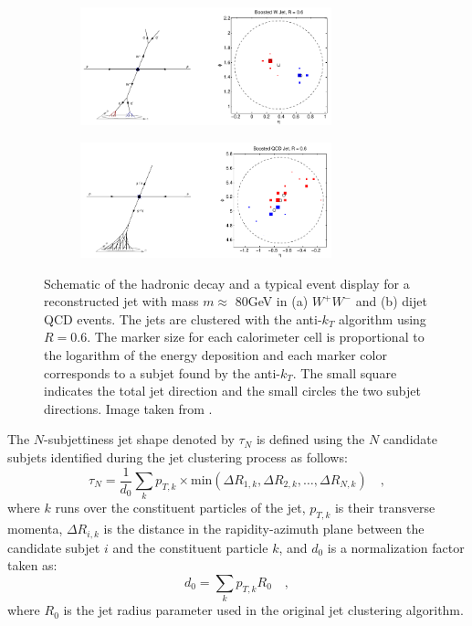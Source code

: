 \documentclass[main]{subfiles} %
\begin{document}
\begin{figure}[h]
     \centering
     \begin{subfigure}[h]{\textwidth}
         \centering
         \includegraphics[width=0.8\textwidth]{../Figures/Theory/eflow_W.png}
         \caption{}
         \label{fig:eflow_W}
     \end{subfigure}
     \hfill
     \begin{subfigure}[h]{\textwidth}
         \centering
         \includegraphics[width=0.8\textwidth]{../Figures/Theory/eflow_QCD.png}
         \caption{}
         \label{fig:eflow_QCD}
     \end{subfigure}
     \caption{Schematic of the hadronic decay and a typical event display for a reconstructed jet with mass $m \approx$ 80\;GeV in (a) $W^+W^-$ and (b) dijet QCD events. The jets are clustered with the anti-$k_T$ algorithm using $R = 0.6$. The marker size for each calorimeter cell is proportional to the logarithm of the energy deposition and each marker color corresponds to a subjet found by the anti-$k_T$. The small square indicates the total jet direction and the small circles the two subjet directions. Image taken from \cite{Thaler2011}.}
        \label{fig:energyflow_W_QCD}
\end{figure}

The $N$-subjettiness jet shape denoted by $\tau_N$ is defined using the $N$ candidate subjets identified during the jet clustering process as follows:
\begin{equation}
  \tau_N = \frac{1}{d_0}\sum_k p_{T,k} \times \text{min}(\Delta R_{1,k},\Delta R_{2,k},\dots,\Delta R_{N,k}) \quad ,
\end{equation}
where $k$ runs over the constituent particles of the jet, $p_{T,k}$ is their transverse momenta, $\Delta R_{i,k}$ is the distance in the rapidity-azimuth plane between the candidate subjet $i$ and the constituent particle $k$, and $d_0$ is a normalization factor taken as:
\begin{equation}
  d_0 = \sum_k p_{T,k} R_0 \quad ,
\end{equation}
where $R_0$ is the jet radius parameter used in the original jet clustering algorithm.\\
\end{document}
